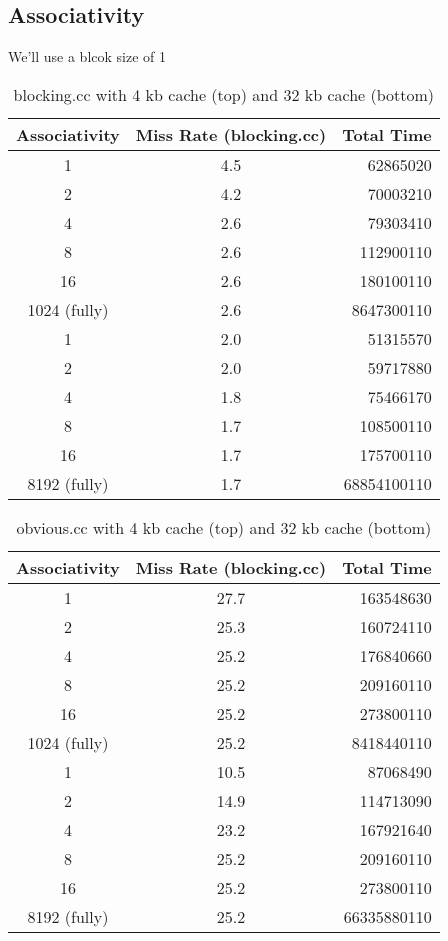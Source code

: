 \documentclass[letterpaper, 12pt, oneside]{memoir}
\begin{document}
\subsection{Associativity}
We'll use a blcok size of 1

\begin{table}[H]
\centering
\begin{tabular}{c|c|r}
    Associativity & Miss Rate (blocking.cc) & Total Time \\ \hline
    1           & 4.5   & 62865020 \\
    2           & 4.2   & 70003210 \\
    4           & 2.6   & 79303410 \\
    8           & 2.6   & 112900110 \\
    16          & 2.6   & 180100110 \\
    1024 (fully) & 2.6   & 8647300110 \\ \hline
    1           & 2.0   & 51315570 \\
    2           & 2.0   & 59717880 \\
    4           & 1.8   & 75466170 \\
    8           & 1.7   & 108500110 \\
    16          & 1.7   & 175700110 \\
    8192 (fully) & 1.7  & 68854100110 \\
\end{tabular}
\caption{blocking.cc with 4 kb cache (top) and 32 kb cache (bottom)}
\end{table}

\begin{table}[H]
\centering
\begin{tabular}{c|c|r}
    Associativity & Miss Rate (blocking.cc) & Total Time \\ \hline
    1           & 27.7  & 163548630 \\
    2           & 25.3  & 160724110 \\
    4           & 25.2  & 176840660 \\
    8           & 25.2  & 209160110 \\
    16          & 25.2  & 273800110 \\
    1024 (fully) & 25.2  & 8418440110 \\ \hline
    1           & 10.5  & 87068490 \\
    2           & 14.9  & 114713090 \\
    4           & 23.2  & 167921640 \\
    8           & 25.2  & 209160110 \\
    16          & 25.2  & 273800110 \\
    8192 (fully) & 25.2 & 66335880110 \\
\end{tabular}
\caption{obvious.cc with 4 kb cache (top) and 32 kb cache (bottom)}
\end{table}
\end{document}

